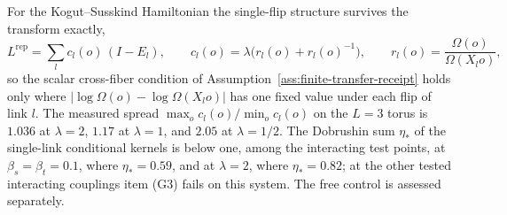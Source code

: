 \documentclass[11pt]{article}
\numberwithin{equation}{section}
\theoremstyle{remark}
\newcommand{\Rep}{\mathrm{rep}}
\begin{document}
For the Kogut--Susskind Hamiltonian the single-flip structure survives the
transform exactly,
\[
L^{\Rep}=\sum_lc_l(o)\,(I-E_l),
\qquad
c_l(o)=\lambda\bigl(r_l(o)+r_l(o)^{-1}\bigr),
\qquad
r_l(o)=\frac{\Omega(o)}{\Omega(X_lo)},
\]
so the scalar cross-fiber condition of
Assumption~\ref{ass:finite-transfer-receipt} holds only where
\(\lvert\log\Omega(o)-\log\Omega(X_lo)\rvert\) has one fixed value under each
flip of link \(l\). The measured spread
\(\max_oc_l(o)/\min_oc_l(o)\) on the \(L=3\)
torus is \(1.036\) at \(\lambda=2\), \(1.17\) at \(\lambda=1\), and \(2.05\)
at \(\lambda=1/2\). The Dobrushin sum \(\eta_*\) of the single-link
conditional kernels is below one, among the interacting test points, at
\(\beta_s=\beta_t=0.1\), where \(\eta_*=0.59\), and at \(\lambda=2\), where
\(\eta_*=0.82\); at the other tested interacting couplings item \textup{(G3)}
fails on this system. The free control is assessed separately.
\end{document}
